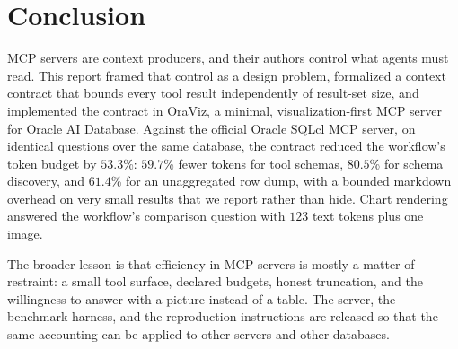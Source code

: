 \section{Conclusion}\label{sec:conclusion}

MCP servers are context producers, and their authors control what agents must read. This report framed that control as a design problem, formalized a context contract that bounds every tool result independently of result-set size, and implemented the contract in OraViz, a minimal, visualization-first MCP server for Oracle AI Database. Against the official Oracle SQLcl MCP server, on identical questions over the same database, the contract reduced the workflow's token budget by $53.3$\%: $59.7$\% fewer tokens for tool schemas, $80.5$\% for schema discovery, and $61.4$\% for an unaggregated row dump, with a bounded markdown overhead on very small results that we report rather than hide. Chart rendering answered the workflow's comparison question with $123$ text tokens plus one image.

The broader lesson is that efficiency in MCP servers is mostly a matter of restraint: a small tool surface, declared budgets, honest truncation, and the willingness to answer with a picture instead of a table. The server, the benchmark harness, and the reproduction instructions are released so that the same accounting can be applied to other servers and other databases.
